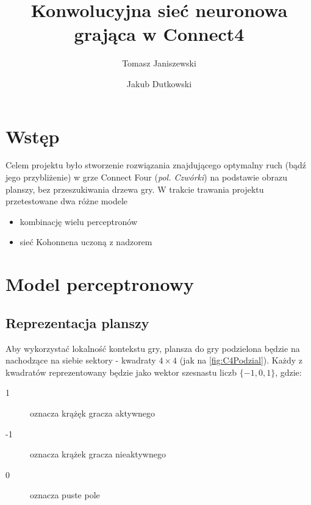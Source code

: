 \documentclass{llncs}
\begin{document}
\title{Konwolucyjna sieć neuronowa grająca w Connect4}
%
%
\author{Tomasz Janiszewski \and Jakub Dutkowski}
%
%


\maketitle              %

%
\section{Wstęp}
Celem projektu było stworzenie rozwiązania znajdującego optymalny ruch (bądź jego przybliżenie) w grze Connect Four (\emph{pol. Czwórki}) \cite{connect4:wiki} na podstawie obrazu planszy, bez przeszukiwania drzewa gry. 
W trakcie trawania projektu przetestowane dwa różne modele
\begin{itemize}
	\item kombinację wielu perceptronów
	\item sieć Kohonnena uczoną z nadzorem
\end{itemize}

\section{Model perceptronowy}

\subsection{Reprezentacja planszy}
Aby wykorzystać lokalność kontekstu gry, plansza do gry podzielona będzie na nachodzące na siebie sektory - kwadraty $4 \times 4$ (jak na \autoref{fig:C4Podzial}). 
Każdy z kwadratów reprezentowany będzie jako wektor szesnastu liczb $\{-1, 0, 1\}$, gdzie:
\begin{description}
	\item[1] oznacza krążęk gracza aktywnego
	\item[-1] oznacza krążek gracza nieaktywnego
	\item[0] oznacza puste pole
\end{description} 
\end{document}
